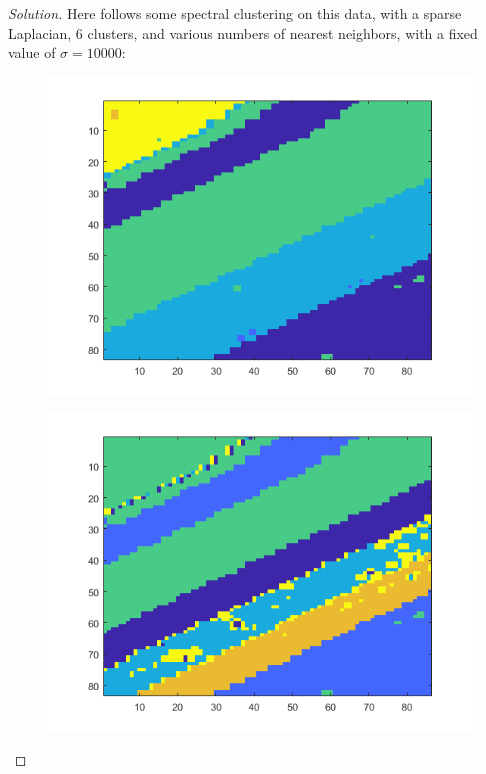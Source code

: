 \documentclass[10pt]{article}
\begin{document}
\begin{proof}[Solution]

Here follows some spectral clustering on this data, with a sparse Laplacian, 6 clusters, and various numbers of nearest neighbors, with a fixed value of $\sigma = 10000$:

\begin{figure}[H]
\centering
\begin{minipage}{.5\textwidth}
  \centering
  \includegraphics[width=\linewidth]{5_nn}
  \label{fig:test1}
\end{minipage}%
\begin{minipage}{.5\textwidth}
  \centering
  \includegraphics[width=\linewidth]{10_nn}
  \label{fig:test2}
\end{minipage}
\end{figure}


\end{proof}
\end{document}
